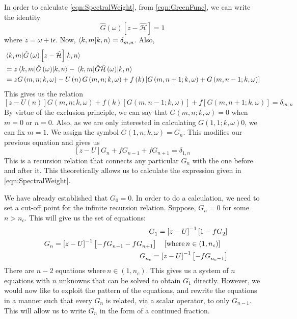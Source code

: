 \documentclass[a4paper, 11pt]{report}
\newcommand{\I}{\mathrm{i}}
\begin{document}
In order to calculate \eqref{eqn:SpectralWeight}, from \eqref{eqn:GreenFunc}, we can write the identity
\begin{displaymath}
\hat{G}\left(\omega\right)\left[ z - \hat{\mathcal{H}} \right] = 1
\end{displaymath}
where $z = \omega + \I \epsilon$. Now, $\braket{k, m}{k, n} = \delta^{}_{m,n}$. Also,
\begin{displaymath}
\begin{split}
&\mel{k,m}{\hat{G}\left(\omega\right)\left[ z - \hat{\mathcal{H}} \right]}{k,n}\\
&= z  \mel{k, m}{\hat{G}\left(\omega\right)}{k, n} -  \mel{k, m}{\hat{G}\hat{\mathcal{H}}\left(\omega\right)}{k, n}\\
&= z G\left(m, n; k, \omega \right) - U \left( n\right)  G\left(m, n; k, \omega \right) + f\left( k\right) \left[ G\left(m, n + 1; k, \omega \right) + G\left(m, n - 1; k, \omega \right) \right]
\end{split}
\end{displaymath}
This gives us the relation
\begin{equation}
\left[  z - U \left( n\right) \right]   G\left(m, n; k, \omega \right) + f\left( k\right) \left[ G\left(m, n - 1; k, \omega \right)\right]  + f \left[ G\left(m, n + 1; k, \omega \right) \right] = \delta^{}_{m, n}
\end{equation}
By virtue of the exclusion principle, we can say that $G\left(m, n; k, \omega\right) = 0$ when $m = 0$ or $n = 0$. Also, as we are only interested in calculating $G\left(1, 1; k, \omega\right)0$, we can fix $m = 1$. We assign the symbol $G\left(1, n; k, \omega \right) = G^{}_n$. This modifies our previous equation and gives us
\begin{equation}
\left[ z - U \right]   G^{}_{n} + f G^{}_{n - 1}  + f G^{}_{n + 1} = \delta^{}_{1, n}
\end{equation}
This is a recursion relation that connects any particular $G^{}_{n}$ with the one before and after it. This theoretically allows us to calculate the expression given in \eqref{eqn:SpectralWeight}.

We have already established that $G^{}_{0} = 0$. In order to do a calculation, we need to set a cut-off point for the infinite recursion relation. Suppose, $G^{}_{n} = 0$ for some $n > n_c$. This will give us the set of equations:
\begin{eqnarray}
&&G^{}_{1} = \left[ z - U \right] ^{-1} \left[ 1 - f G^{}_{2} \right] \\
&&G^{}_{n} = \left[ z - U \right] ^{-1} \left[ - f G^{}_{n - 1}   - f G^{}_{n + 1}\right] \qq{[where\,$n \in \left( 1, n_c \right)$]}\\
&&G^{}_{n_c} = \left[ z - U \right] ^{-1} \left[ - f G^{}_{n_c-1} \right]
\end{eqnarray}
There are $n - 2$ equations where\,$n \in \left( 1, n_c \right)$. This gives us a system of $n$ equations with $n$ unknowns that can be solved to obtain $G^{}_1$ directly. However, we would now like to exploit the pattern of the equations, and rewrite the equations in a manner such that every $G^{}_n$ is related, via a scalar operator, to only $G^{}_{n - 1}$. This will allow us to write $G^{}_n$ in the form of a continued fraction.
\end{document}
